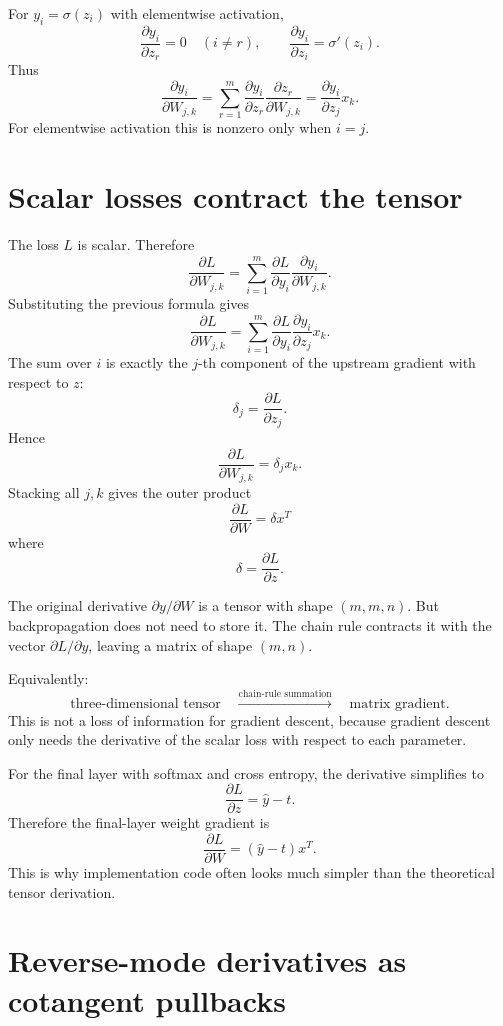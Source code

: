 For $y_i=\sigma(z_i)$ with elementwise activation,
\[
  \frac{\partial y_i}{\partial z_r}=0\quad(i\ne r),\qquad
  \frac{\partial y_i}{\partial z_i}=\sigma'(z_i).
\]
Thus
\[
  \frac{\partial y_i}{\partial W_{j,k}}
  =\sum_{r=1}^m
  \frac{\partial y_i}{\partial z_r}
  \frac{\partial z_r}{\partial W_{j,k}}
  =\frac{\partial y_i}{\partial z_j}x_k.
\]
For elementwise activation this is nonzero only when $i=j$.

\section{Scalar losses contract the tensor}

The loss $L$ is scalar.  Therefore
\[
  \frac{\partial L}{\partial W_{j,k}}
  =\sum_{i=1}^m
  \frac{\partial L}{\partial y_i}
  \frac{\partial y_i}{\partial W_{j,k}}.
\]
Substituting the previous formula gives
\[
  \frac{\partial L}{\partial W_{j,k}}
  =\sum_{i=1}^m
  \frac{\partial L}{\partial y_i}
  \frac{\partial y_i}{\partial z_j}x_k.
\]
The sum over $i$ is exactly the $j$-th component of the upstream gradient with respect to $z$:
\[
  \delta_j=\frac{\partial L}{\partial z_j}.
\]
Hence
\[
  \frac{\partial L}{\partial W_{j,k}}=\delta_jx_k.
\]
Stacking all $j,k$ gives the outer product
\[
  \boxed{\displaystyle
  \frac{\partial L}{\partial W}=\delta x^T
  }
\]
where
\[
  \delta=\frac{\partial L}{\partial z}.
\]

The original derivative $\partial y/\partial W$ is a tensor with shape $(m,m,n)$.  But backpropagation does not need to store it.  The chain rule contracts it with the vector $\partial L/\partial y$, leaving a matrix of shape $(m,n)$.

Equivalently:
\[
  \text{three-dimensional tensor}
  \quad\xrightarrow{\text{chain-rule summation}}
  \quad
  \text{matrix gradient}.
\]
This is not a loss of information for gradient descent, because gradient descent only needs the derivative of the scalar loss with respect to each parameter.

For the final layer with softmax and cross entropy, the derivative simplifies to
\[
  \frac{\partial L}{\partial z}=\hat y-t.
\]
Therefore the final-layer weight gradient is
\[
  \frac{\partial L}{\partial W}=(\hat y-t)x^T.
\]
This is why implementation code often looks much simpler than the theoretical tensor derivation.

\section{Reverse-mode derivatives as cotangent pullbacks}

